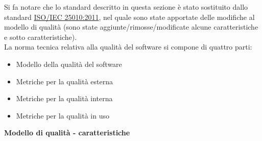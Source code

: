 		Si fa notare che lo standard descritto in questa sezione è stato sostituito dallo standard \href{http://www.iso.org/iso/iso_catalogue/catalogue_tc/catalogue_detail.htm?csnumber=35733}{ISO/IEC 25010:2011}, nel quale sono state apportate delle modifiche al modello di qualità (sono state aggiunte/rimosse/modificate alcune caratteristiche e sotto caratteristiche).\\
		La norma tecnica relativa alla qualità del software si compone di quattro parti:
		\begin{itemize}
			\item Modello della qualità del software
			\item Metriche per la qualità esterna
			\item Metriche per la qualità interna
			\item Metriche per la qualità in uso
		\end{itemize}
		
		\textbf{Modello di qualità - caratteristiche}
		
